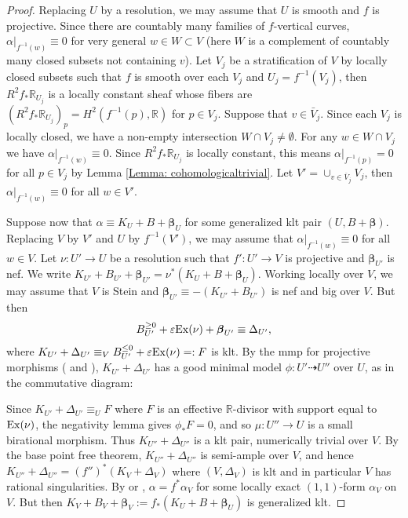 \documentclass[12pt]{amsart}
\numberwithin{equation}{section}
\theoremstyle{definition}
\theoremstyle{plain}
\newtheorem*{thm A*}{Theorem A}
\newtheorem*{thm B*}{Theorem B}
\newtheorem*{thm C*}{Theorem C}
\newtheorem*{thm D*}{Theorem D}
\theoremstyle{definition}
\renewcommand{\1}{\mathds{1}}
\newcommand{\bbeta}{\boldsymbol{\beta}}
\renewcommand{\>}{\rightarrow}
\begin{document}
\begin{proof}
Replacing $U$ by a resolution, we may assume that $U$ is smooth and $f$ is projective. Since there are countably many families of $f$-vertical curves, $\alpha |_{f^{-1}(w)}\equiv 0$ for very general $w\in W\subset V$ (here $W$ is a complement of countably many closed subsets not containing $v$). Let $V_j$ be a stratification of $V$ by locally closed subsets such that $f$ is smooth over each $V_j$ and $U_j=f^{-1}(V_j)$, then $R^2f_*\mathbb R _{U_j}$ is a locally constant sheaf whose fibers are $(R^2f_*\mathbb R _{U_j})_p=H^2(f^{-1} (p),\mathbb R )$ for $p\in V_j$. Suppose that $v\in \bar V_j$. Since each $V_j$ is locally closed, we have a non-empty intersection $W\cap V_j \ne \emptyset$. For any $w\in W \cap V_j$ we have $\alpha|_{f^{-1}(w)} \equiv 0$. Since $R^2 f_* \mathbb{R}_{U_j}$ is locally constant, this means $\alpha|_{f^{-1}(p)} =0 $ for all $p\in V_j$ by Lemma \ref{Lemma: cohomologicaltrivial}. 
Let $V'=\cup _{v\in \overline V_j}V_j$, then $\alpha |_{f^{-1}(w)}\equiv 0$ for all $w\in V'$.

Suppose now that  $\alpha \equiv K_U+B+\bbeta _U$ for some generalized klt pair $(U,B+\bbeta )$. Replacing $V$ by $V'$ and $U$ by $f^{-1}(V')$, we may assume that $\alpha |_{f^{-1}(w)}\equiv 0$ for all $w\in V$.
Let $\nu :U'\to U$ be a resolution such that $f':U'\to V$ is projective and $\bbeta _{U'}$ is nef. 
We write $K_{U'}+B_{U'}+\bbeta _{U'}=\nu ^*(K_U+B+\bbeta _U)$. 
Working locally over $V$, we may assume that $V$ is Stein and $\bbeta _{U'}\equiv -(K_{U'}+B_{U'})$ is nef and big over $V$. But then \[B_{U'}^{\ge 0}+\varepsilon {\rm Ex}(\nu )+\bbeta _{U'}\equiv \Delta _{U'},\] where $K_{U'}+\Delta _{U'}\equiv _V B_{U'}^{\leq 0}+\varepsilon {\rm Ex}(\nu )=:F$ is klt. By the mmp for projective morphisms (\cite{FujinoBCHM} and \cite{DHP24}), $K_{U'}+\Delta _{U'}$ has a good minimal model $\phi:U'\dasharrow U''$ over $U$, as in the commutative diagram:
\begin{center}
\end{center}
Since $K_{U'}+\Delta  _{U'}\equiv _{U}F$ where $F$ is an effective $\mathbb R$-divisor with support equal to ${\rm Ex}(\nu)$, the negativity lemma gives $\phi _*F=0$, and so $\mu:U''\to U$ is a small birational morphism. Thus $K_{U''}+\Delta _{U''}$ is a klt pair, numerically trivial over $V$. By the base point free theorem, $K_{U''}+\Delta _{U''}$ is semi-ample over $V$, and hence $K_{U''}+\Delta _{U''}=(f'')^*(K_V+\Delta _V)$ where $(V,\Delta _V)$ is klt and in particular $V$ has rational singularities. By \cite[Lemma 3.3]{HP16} or \cite[Lemma 2.6]{DH24MMP}, $\alpha =f^*\alpha _V$ for some locally exact $(1,1)$-form $\alpha _V$ on $V$. But then $K_V+B_V+\bbeta _V:=f_*(K_U+B+\bbeta _U)$ is generalized klt. 
\end{proof}
\end{document}
